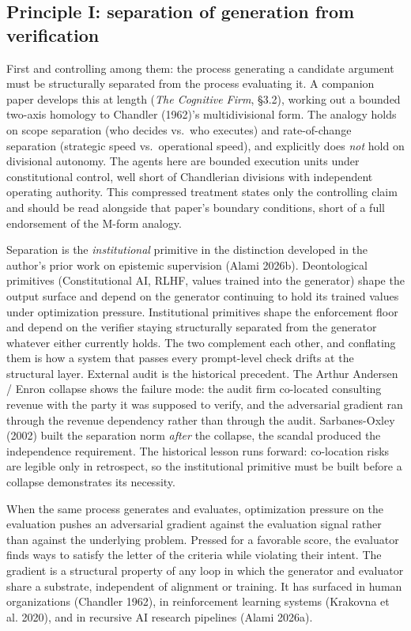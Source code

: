 \documentclass[
  11pt,
]{article}
\begin{document}
\subsection{Principle I: separation of generation from
verification}\label{principle-i-separation-of-generation-from-verification}

First and controlling among them: the process generating a candidate
argument must be structurally separated from the process evaluating it. A
companion paper develops this at length (\emph{The Cognitive Firm}, §3.2),
working out a bounded two-axis homology to Chandler (1962)'s
multidivisional form. The analogy holds on scope separation (who decides
vs.~who executes) and rate-of-change separation (strategic speed
vs.~operational speed), and explicitly does \emph{not} hold on divisional
autonomy. The agents here are bounded execution units under
constitutional control, well short of Chandlerian divisions with
independent operating authority. This compressed treatment states only
the controlling claim and should be read alongside that paper's boundary
conditions, short of a full endorsement of the M-form analogy.

Separation is the \emph{institutional} primitive in the distinction
developed in the author's prior work on epistemic supervision (Alami
2026b). Deontological primitives (Constitutional AI, RLHF, values trained
into the generator) shape the output surface and depend on the generator
continuing to hold its trained values under optimization pressure.
Institutional primitives shape the enforcement floor and depend on the
verifier staying structurally separated from the generator whatever
either currently holds. The two complement each other, and conflating
them is how a system that passes every prompt-level check drifts at the
structural layer. External audit is the historical precedent. The Arthur
Andersen / Enron collapse shows the failure mode: the audit firm
co-located consulting revenue with the party it was supposed to verify,
and the adversarial gradient ran through the revenue dependency rather
than through the audit. Sarbanes-Oxley (2002) built the separation norm
\emph{after} the collapse, the scandal produced the independence
requirement. The historical lesson runs forward: co-location risks are
legible only in retrospect, so the institutional primitive must be built
before a collapse demonstrates its necessity.

When the same process generates and evaluates, optimization pressure on
the evaluation pushes an adversarial gradient against the evaluation
signal rather than against the underlying problem. Pressed for a
favorable score, the evaluator finds ways to satisfy the letter of the
criteria while violating their intent. The gradient is a structural
property of any loop in which the generator and evaluator share a
substrate, independent of alignment or training. It has surfaced in human
organizations (Chandler 1962), in reinforcement learning systems
(Krakovna et al. 2020), and in recursive AI research pipelines (Alami
2026a).
\end{document}
